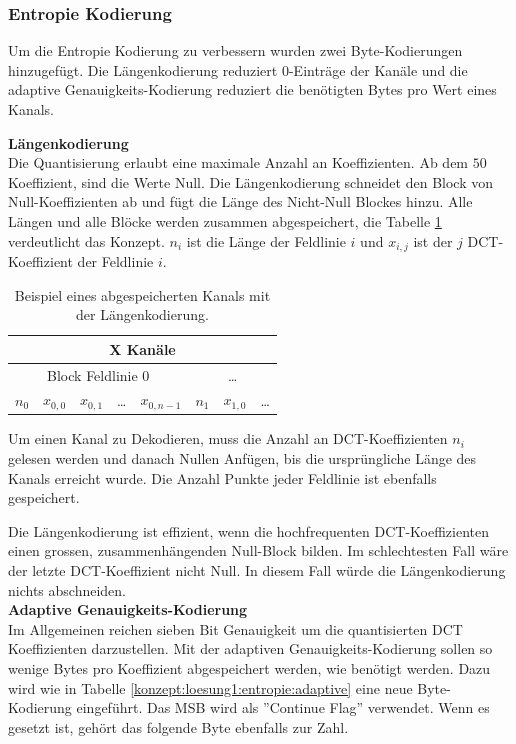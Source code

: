 \subsubsection{Entropie Kodierung}\label{konzept:loesung1:kodierung}
Um die Entropie Kodierung zu verbessern wurden zwei Byte-Kodierungen hinzugefügt. Die Längenkodierung reduziert 0-Einträge der Kanäle und die adaptive Genauigkeits-Kodierung reduziert die benötigten Bytes pro Wert eines Kanals.

\textbf{Längenkodierung}\\
Die Quantisierung erlaubt eine maximale Anzahl an Koeffizienten. Ab dem $50$ Koeffizient, sind die Werte Null. Die Längenkodierung schneidet den Block von Null-Koeffizienten ab und fügt die Länge des Nicht-Null Blockes hinzu. Alle Längen und alle Blöcke werden zusammen abgespeichert, die Tabelle \ref{konzept:loesung1:entropie:laengenkodierung} verdeutlicht das Konzept. $n_i$ ist die Länge der Feldlinie $i$ und $x_{i,j}$ ist der $j$ DCT-Koeffizient der Feldlinie $i$.

\begin{table}[!htbp]
	\center
	\begin{tabular}{||c|c|c|c|c||c|c|c}
		\hline
		\multicolumn{8}{|c|}{X Kanäle}\\\hline\hline
		 \multicolumn{5}{||c||}{Block Feldlinie 0} & \multicolumn{3}{c}{\ldots} \\\hline
		$n_0$ &$x_{0,0}$ &$x_{0,1}$ & \ldots & $x_{0,n-1}$ & $n_1$ & $x_{1,0}$ & \ldots\\\hline
	\end{tabular}
	\caption{Beispiel eines abgespeicherten Kanals mit der Längenkodierung.}
	\label{konzept:loesung1:entropie:laengenkodierung}
\end{table}
Um einen Kanal zu Dekodieren, muss die Anzahl an DCT-Koeffizienten $n_i$ gelesen werden und danach Nullen Anfügen, bis die ursprüngliche Länge des Kanals erreicht wurde. Die Anzahl Punkte jeder Feldlinie ist ebenfalls gespeichert.

Die Längenkodierung ist effizient, wenn die hochfrequenten DCT-Koeffizienten einen grossen, zusammenhängenden Null-Block bilden. Im schlechtesten Fall wäre der letzte DCT-Koeffizient nicht Null. In diesem Fall würde die Längenkodierung nichts abschneiden.\\

\textbf{Adaptive Genauigkeits-Kodierung}\\
Im Allgemeinen reichen sieben Bit Genauigkeit um die quantisierten DCT Koeffizienten darzustellen. Mit der adaptiven Genauigkeits-Kodierung sollen so wenige Bytes pro Koeffizient abgespeichert werden, wie benötigt werden. Dazu wird wie in Tabelle \ref{konzept:loesung1:entropie:adaptive} eine neue Byte-Kodierung eingeführt. Das MSB wird als ''Continue Flag'' verwendet. Wenn es gesetzt ist, gehört das folgende Byte ebenfalls zur Zahl.

